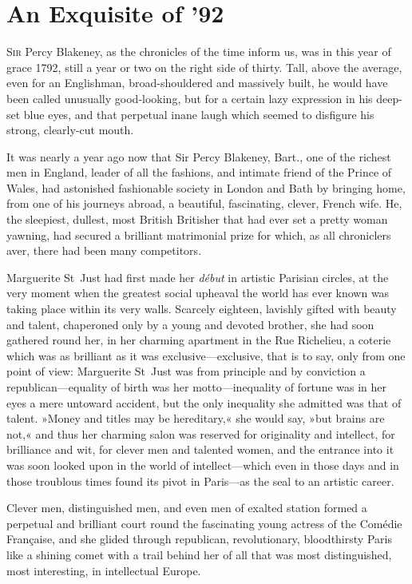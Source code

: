 
\chapter{An Exquisite of '92}
\lettrine[lines=4]{S}{ir} Percy Blakeney, as the chronicles of the time inform us, was in this year of grace 1792, still a year or two on the right side of thirty. Tall, above the average, even for an Englishman, broad-shouldered and massively built, he would have been called unusually good-looking, but for a certain lazy expression in his deep-set blue eyes, and that perpetual inane laugh which seemed to disfigure his strong, clearly-cut mouth.

It was nearly a year ago now that Sir Percy Blakeney, Bart., one of the richest men in England, leader of all the fashions, and intimate friend of the Prince of Wales, had astonished fashionable society in London and Bath by bringing home, from one of his journeys abroad, a beautiful, fascinating, clever, French wife. He, the sleepiest, dullest, most British Britisher that had ever set a pretty woman yawning, had secured a brilliant matrimonial prize for which, as all chroniclers aver, there had been many competitors.

Marguerite St~Just had first made her \textit{début} in artistic Parisian circles, at the very moment when the greatest social upheaval the world has ever known was taking place within its very walls. Scarcely eighteen, lavishly gifted with beauty and talent, chaperoned only by a young and devoted brother, she had soon gathered round her, in her charming apartment in the Rue Richelieu, a coterie which was as brilliant as it was exclusive\allowbreak---\allowbreak exclusive, that is to say, only from one point of view: Marguerite St~Just was from principle and by conviction a republican\allowbreak---\allowbreak equality of birth was her motto\allowbreak---\allowbreak inequality of fortune was in her eyes a mere untoward accident, but the only inequality she admitted was that of talent. »Money and titles may be hereditary,« she would say, »but brains are not,« and thus her charming salon was reserved for originality and intellect, for brilliance and wit, for clever men and talented women, and the entrance into it was soon looked upon in the world of intellect\allowbreak---\allowbreak which even in those days and in those troublous times found its pivot in Paris\allowbreak---\allowbreak as the seal to an artistic career.

Clever men, distinguished men, and even men of exalted station formed a perpetual and brilliant court round the fascinating young actress of the Comédie Française, and she glided through republican, revolutionary, bloodthirsty Paris like a shining comet with a trail behind her of all that was most distinguished, most interesting, in intellectual Europe.

